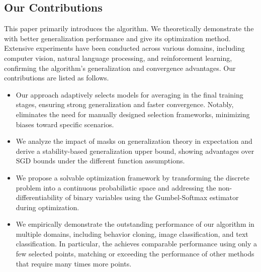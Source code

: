\subsection{Our Contributions}

This paper primarily introduces the \method{} algorithm. We theoretically demonstrate the \method{} with better generalization performance and give its optimization method. Extensive experiments have been conducted across various domains, including computer vision, natural language processing, and reinforcement learning, confirming the algorithm's generalization and convergence advantages. Our contributions are listed as follows. 

\begin{itemize}
\item Our approach adaptively selects models for averaging in the final training stages, ensuring strong generalization and faster convergence. Notably, \method{} eliminates the need for manually designed selection frameworks, minimizing biases toward specific scenarios.

\item We analyze the impact of masks on generalization theory in expectation and derive a stability-based generalization upper bound, showing advantages over SGD bounds under the different function assumptions.

\item We propose a solvable optimization framework by transforming the discrete problem into a continuous probabilistic space and addressing the non-differentiability of binary variables using the Gumbel-Softmax estimator during optimization.


\item We empirically demonstrate the outstanding performance of our algorithm in multiple domains, including behavior cloning, image classification, and text classification. In particular, the \method{} achieves comparable performance using only a few selected points, matching or exceeding the performance of other methods that require many times more points.
\end{itemize}

